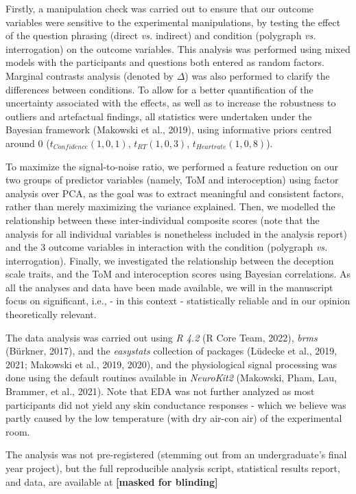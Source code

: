 \documentclass[
  man,mask,floatsintext]{apa6}
\begin{document}
Firstly, a manipulation check was carried out to ensure that our outcome variables were sensitive to the experimental manipulations, by testing the effect of the question phrasing (direct \emph{vs.} indirect) and condition (polygraph \emph{vs.} interrogation) on the outcome variables. This analysis was performed using mixed models with the participants and questions both entered as random factors. Marginal contrasts analysis (denoted by \(\Delta\)) was also performed to clarify the differences between conditions. To allow for a better quantification of the uncertainty associated with the effects, as well as to increase the robustness to outliers and artefactual findings, all statistics were undertaken under the Bayesian framework (Makowski et al., 2019), using informative priors centred around 0 (\(t_{Confidence}(1, 0, 1)\), \(t_{RT}(1, 0, 3)\), \(t_{Heartrate}(1, 0, 8)\)).

To maximize the signal-to-noise ratio, we performed a feature reduction on our two groups of predictor variables (namely, ToM and interoception) using factor analysis over PCA, as the goal was to extract meaningful and consistent factors, rather than merely maximizing the variance explained. Then, we modelled the relationship between these inter-individual composite scores (note that the analysis for all individual variables is nonetheless included in the analysis report) and the 3 outcome variables in interaction with the condition (polygraph \emph{vs.} interrogation). Finally, we investigated the relationship between the deception scale traits, and the ToM and interoception scores using Bayesian correlations. As all the analyses and data have been made available, we will in the manuscript focus on significant, i.e., - in this context - statistically reliable and in our opinion theoretically relevant.

The data analysis was carried out using \emph{R 4.2} (R Core Team, 2022), \emph{brms} (Bürkner, 2017), and the \emph{easystats} collection of packages (Lüdecke et al., 2019, 2021; Makowski et al., 2019, 2020), and the physiological signal processing was done using the default routines available in \emph{NeuroKit2} (Makowski, Pham, Lau, Brammer, et al., 2021). Note that EDA was not further analyzed as most participants did not yield any skin conductance responses - which we believe was partly caused by the low temperature (with dry air-con air) of the experimental room.

The analysis was not pre-registered (stemming out from an undergraduate's final year project), but the full reproducible analysis script, statistical results report, and data, are available at
\textbf{{[}masked for blinding{]}}
\end{document}
